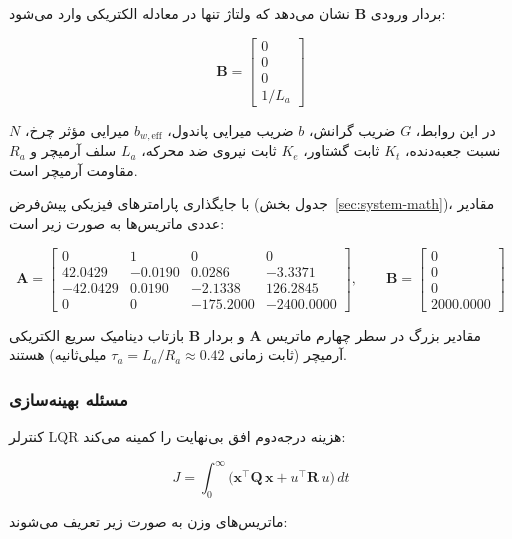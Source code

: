 بردار ورودی $\mathbf{B}$ نشان می‌دهد که ولتاژ تنها در معادله الکتریکی وارد می‌شود:

\begin{equation}
\mathbf{B} = \begin{bmatrix} 0 \\ 0 \\ 0 \\ 1/L_a \end{bmatrix}
\end{equation}

در این روابط، $G$ ضریب گرانش، $b$ ضریب میرایی پاندول، $b_{w,\text{eff}}$ میرایی مؤثر چرخ، $N$ نسبت جعبه‌دنده، $K_t$ ثابت گشتاور، $K_e$ ثابت نیروی ضد محرکه، $L_a$ سلف آرمیچر و $R_a$ مقاومت آرمیچر است.

با جایگذاری پارامترهای فیزیکی پیش‌فرض (جدول بخش~\ref{sec:system-math})، مقادیر عددی ماتریس‌ها به صورت زیر است:

\begin{equation}
\mathbf{A} = \begin{bmatrix}
0 & 1 & 0 & 0 \\
42.0429 & -0.0190 & 0.0286 & -3.3371 \\
-42.0429 & 0.0190 & -2.1338 & 126.2845 \\
0 & 0 & -175.2000 & -2400.0000
\end{bmatrix},
\qquad
\mathbf{B} = \begin{bmatrix} 0 \\ 0 \\ 0 \\ 2000.0000 \end{bmatrix}
\end{equation}

مقادیر بزرگ در سطر چهارم ماتریس $\mathbf{A}$ و بردار $\mathbf{B}$ بازتاب دینامیک سریع الکتریکی آرمیچر (ثابت زمانی $\tau_a = L_a/R_a \approx 0.42$ میلی‌ثانیه) هستند.

\subsubsection{مسئله بهینه‌سازی}

کنترلر LQR هزینه درجه‌دوم افق بی‌نهایت را کمینه می‌کند:

\begin{equation}
J = \int_0^\infty \!\big(\mathbf{x}^\top \mathbf{Q}\, \mathbf{x} + u^\top \mathbf{R}\, u\big)\, dt
\end{equation}

ماتریس‌های وزن به صورت زیر تعریف می‌شوند:

